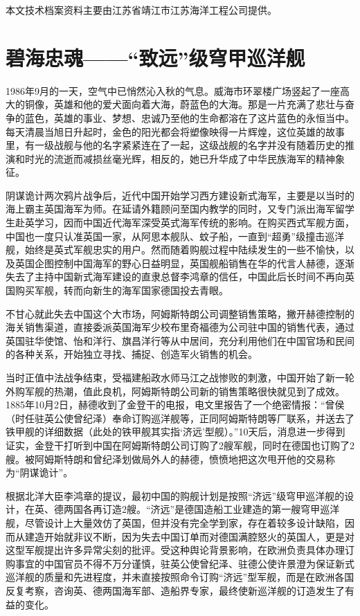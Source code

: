 \documentclass[12pt,UTF8]{ctexbook}
\begin{document}
本文技术档案资料主要由江苏省靖江市江苏海洋工程公司提供。

\chapter{碧海忠魂——“致远”级穹甲巡洋舰}

1986年9月的一天，空气中已悄然沁入秋的气息。威海市环翠楼广场竖起了一座高大的铜像，英雄和他的爱犬面向着大海，蔚蓝色的大海。那是一片充满了悲壮与奋争的蓝色，英雄的事业、梦想、忠诚乃至他的生命都溶在了这片蓝色的永恒当中。每天清晨当旭日升起时，金色的阳光都会将塑像映得一片辉煌，这位英雄的故事里，有一级战舰与他的名字紧紧连在了一起，这级战舰的名字并没有随着历史的推演和时光的流逝而减损丝毫光辉，相反的，她已升华成了中华民族海军的精神象征。

阴谋诡计两次鸦片战争后，近代中国开始学习西方建设新式海军，主要是以当时的海上霸主英国海军为师。在延请外籍顾问至国内教学的同时，又专门派出海军留学生赴英学习，因而中国近代海军深受英式海军传统的影响。在购买西式军舰方面，中国也一度只认准英国一家，从阿思本舰队、蚊子船，一直到“超勇”级撞击巡洋舰，始终是英式军舰忠实的用户。然而随着购舰过程中陆续发生的一些不愉快，以及英国企图控制中国海军的野心日益明显，英国舰船销售在华的代言人赫德，逐渐失去了主持中国新式海军建设的直隶总督李鸿章的信任，中国此后长时间不再向英国购买军舰，转而向新生的海军国家德国投去青眼。

不甘心就此失去中国这个大市场，阿姆斯特朗公司调整销售策略，撇开赫德控制的海关销售渠道，直接委派英国海军少校布里奇福德为公司驻中国的销售代表，通过英国驻华使馆、怡和洋行、旗昌洋行等从中居间，充分利用他们在中国官场和民间的各种关系，开始独立寻找、捕捉、创造军火销售的机会。

当时正值中法战争结束，受福建船政水师马江之战惨败的刺激，中国开始了新一轮外购军舰的热潮，值此良机，阿姆斯特朗公司新的销售策略很快就见到了成效。1885年10月2日，赫德收到了金登干的电报，电文里报告了一个绝密情报：“曾侯（时任驻英公使曾纪泽）奉命订购巡洋舰等，正同阿姆斯特朗等厂联系，并送去了铁甲舰的详细数据（此处的铁甲舰其实指‘济远’型舰）。”10天后，消息进一步得到证实，金登干打听到中国在阿姆斯特朗公司订购了2艘军舰，同时在德国也订购了2艘。被阿姆斯特朗和曾纪泽划做局外人的赫德，愤愤地把这次甩开他的交易称为“阴谋诡计”。

根据北洋大臣李鸿章的提议，最初中国的购舰计划是按照“济远”级穹甲巡洋舰的设计，在英、德两国各再订造2艘。“济远”是德国造船工业建造的第一艘穹甲巡洋舰，尽管设计上大量效仿了英国，但并没有完全学到家，存在着较多设计缺陷，因而从建造开始就非议不断，因为失去中国订单而对德国满腔怒火的英国人，更是对这型军舰提出许多异常尖刻的批评。受这种舆论背景影响，在欧洲负责具体办理订购事宜的中国官员不得不万分谨慎，驻英公使曾纪泽、驻德公使许景澄为保证新式巡洋舰的质量和先进程度，并未直接按照命令订购“济远”型军舰，而是在欧洲各国反复考察，咨询英、德两国海军部、造船界专家，最终使新巡洋舰的订造发生了有益的变化。
\end{document}

